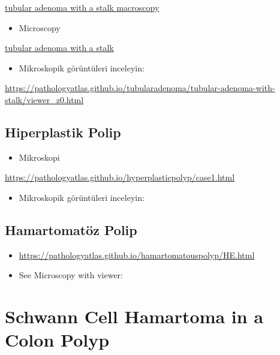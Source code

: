 \documentclass[
  letterpaper,
  DIV=11,
  numbers=noendperiod]{scrreprt}
\providecommand{\tightlist}{%
  \setlength{\itemsep}{0pt}\setlength{\parskip}{0pt}}
\begin{document}
\href{https://pathologyatlas.github.io/tubularadenoma/tubular-adenoma-with-stalk-macroscopy.jpg}{tubular
adenoma with a stalk macroscopy}

\begin{itemize}
\tightlist
\item
  Microscopy
\end{itemize}

\href{https://pathologyatlas.github.io/tubularadenoma/tubular-adenoma-with-stalk.jpeg}{tubular
adenoma with a stalk}

\begin{itemize}
\tightlist
\item
  Mikroskopik görüntüleri inceleyin:
\end{itemize}

\url{https://pathologyatlas.github.io/tubularadenoma/tubular-adenoma-with-stalk/viewer_z0.html}

\hypertarget{hiperplastik-polip}{%
\section{Hiperplastik Polip}\label{hiperplastik-polip}}

\begin{itemize}
\tightlist
\item
  Mikroskopi
\end{itemize}

\url{https://pathologyatlas.github.io/hyperplasticpolyp/case1.html}

\begin{itemize}
\tightlist
\item
  Mikroskopik görüntüleri inceleyin:
\end{itemize}

\hypertarget{hamartomatuxf6z-polip-1}{%
\section{Hamartomatöz Polip}\label{hamartomatuxf6z-polip-1}}

\begin{itemize}
\item
  \url{https://pathologyatlas.github.io/hamartomatouspolyp/HE.html}
\item
  See Microscopy with viewer:
\end{itemize}

\hypertarget{schwann-cell-hamartoma-in-a-colon-polyp-1}{%
\chapter{Schwann Cell Hamartoma in a Colon
Polyp}\label{schwann-cell-hamartoma-in-a-colon-polyp-1}}
\end{document}
